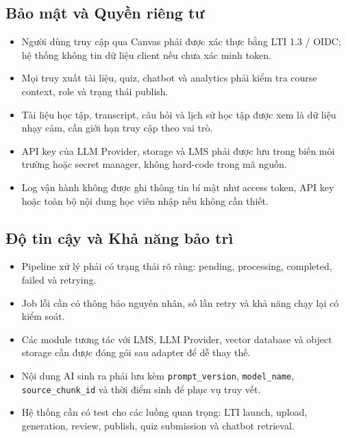 \subsection{Bảo mật và Quyền riêng tư}
\label{subsec:bao-mat-quyen-rieng-tu}

\begin{itemize}
    \item Người dùng truy cập qua Canvas phải được xác thực bằng LTI 1.3 /
          OIDC; hệ thống không tin dữ liệu client nếu chưa xác minh token.
    \item Mọi truy xuất tài liệu, quiz, chatbot và analytics phải kiểm tra
          course context, role và trạng thái publish.
    \item Tài liệu học tập, transcript, câu hỏi và lịch sử học tập được xem là
          dữ liệu nhạy cảm, cần giới hạn truy cập theo vai trò.
    \item API key của LLM Provider, storage và LMS phải được lưu trong biến môi
          trường hoặc secret manager, không hard-code trong mã nguồn.
    \item Log vận hành không được ghi thông tin bí mật như access token, API
          key hoặc toàn bộ nội dung học viên nhập nếu không cần thiết.
\end{itemize}

\subsection{Độ tin cậy và Khả năng bảo trì}
\label{subsec:do-tin-cay-kha-nang-bao-tri}

\begin{itemize}
    \item Pipeline xử lý phải có trạng thái rõ ràng: pending, processing,
          completed, failed và retrying.
    \item Job lỗi cần có thông báo nguyên nhân, số lần retry và khả năng chạy
          lại có kiểm soát.
    \item Các module tương tác với LMS, LLM Provider, vector database và object
          storage cần được đóng gói sau adapter để dễ thay thế.
    \item Nội dung AI sinh ra phải lưu kèm \texttt{prompt\_version},
          \texttt{model\_name}, \texttt{source\_chunk\_id} và thời điểm sinh để
          phục vụ truy vết.
    \item Hệ thống cần có test cho các luồng quan trọng: LTI launch, upload,
          generation, review, publish, quiz submission và chatbot retrieval.
\end{itemize}

